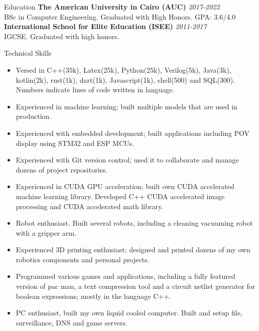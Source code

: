 \documentclass{resume}
\begin{document}
\begin{small}
	
	\begin{rSection}{Education}
		{\bf The American University in Cairo (AUC)} \hfill {\em 2017-2022} \\
		BSc in Computer Engineering. Graduated with High Honors. GPA: 3.6/4.0\\
		{\bf International School for Elite Education (ISEE)} \hfill {\em 2011-2017}\\
		IGCSE. Graduated with high honors.
	\end{rSection}
	
	\begin{rSection}{Technical Skills}
		\begin{itemize}
			\itemsep-0.4em
			\item Versed in C++(35k), Latex(25k), Python(25k), Verilog(5k), Java(3k), kotlin(2k), rust(1k), dart(1k), Javascript(1k), shell(500) and SQL(300). Numbers indicate lines of code written in language.
			\item Experienced in machine learning; built multiple models that are used in production.
			\item Experienced with embedded development; built applications including POV display using STM32 and ESP MCUs.
			\item Experienced with Git version control; used it to collaborate and manage dozens of project repositories.
			\item Experienced in CUDA GPU acceleration; built own CUDA accelerated machine learning library. Developed C++ CUDA accelerated image processing and CUDA accelerated math library.
			\item Robot enthusiast. Built several robots, including a cleaning vacuuming robot with a gripper arm.
			\item Experienced 3D printing enthusiast; designed and printed dozens of my own robotics components and personal projects.
			\item Programmed various games and applications, including a fully featured version of pac man, a text compression tool and a circuit netlist generator for boolean expressions; mostly in the language C++.
			\item PC enthusiast, built my own liquid cooled computer. Built and setup file, surveillance, DNS and game servers.
		\end{itemize}
	\end{rSection}


\end{small}
\end{document}
